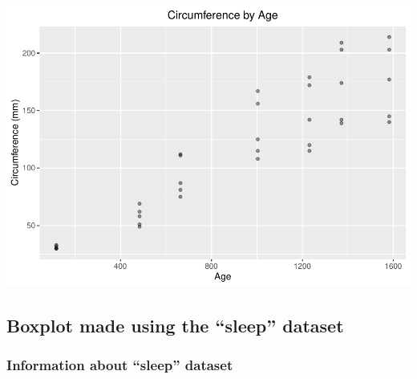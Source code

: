 \documentclass[]{article}
\newenvironment{Shaded}{\begin{snugshade}}{\end{snugshade}}
\newcommand{\DataTypeTok}[1]{\textcolor[rgb]{0.13,0.29,0.53}{#1}}
\newcommand{\FloatTok}[1]{\textcolor[rgb]{0.00,0.00,0.81}{#1}}
\newcommand{\KeywordTok}[1]{\textcolor[rgb]{0.13,0.29,0.53}{\textbf{#1}}}
\newcommand{\NormalTok}[1]{#1}
\newcommand{\OperatorTok}[1]{\textcolor[rgb]{0.81,0.36,0.00}{\textbf{#1}}}
\newcommand{\StringTok}[1]{\textcolor[rgb]{0.31,0.60,0.02}{#1}}
\begin{document}
\begin{Shaded}
\end{Shaded}

\includegraphics{hw02_files/figure-latex/load Orange dataset, scatter Orange-1.pdf}

\hypertarget{boxplot-made-using-the-sleep-dataset}{%
\subsection{Boxplot made using the ``sleep''
dataset}\label{boxplot-made-using-the-sleep-dataset}}

\hypertarget{information-about-sleep-dataset}{%
\subsubsection{Information about ``sleep''
dataset}\label{information-about-sleep-dataset}}
\end{document}
